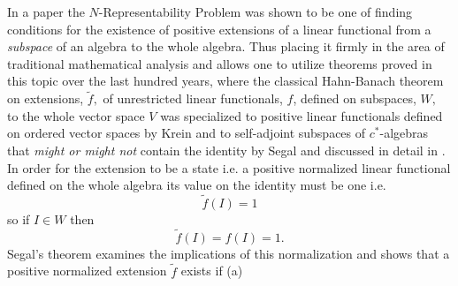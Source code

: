 \documentclass[aps,preprint,amsfonts,amssymb,showpacs,showkeys]{revtex4}%
\begin{document}
In a paper \cite{Weiner83} the $N$-Representability Problem was shown to be
one of finding conditions for the existence of positive extensions of a linear
functional from a \emph{subspace} of an algebra to the whole algebra. Thus
placing it firmly in the area of traditional mathematical analysis and allows
one to utilize theorems proved in this topic over the last hundred years,
where the classical Hahn-Banach theorem \cite{Encyclo} on extensions,
$\tilde{f},$ of unrestricted linear functionals, $f$, defined on subspaces,
$W,$ to the whole vector space $V$ was specialized to positive linear
functionals defined on ordered vector spaces by Krein \cite{Krein,Naimark} and
to self-adjoint subspaces of $c^{\ast}$-algebras \cite{Encyclo} that
\emph{might or might not }contain the identity by Segal \cite{Segal} and
discussed in detail in \cite{KadisonRinrose}. In order for the extension to be
a state \cite{Encyclo} i.e. a positive normalized linear functional defined on
the whole algebra its value on the identity must be one i.e.
\begin{equation}
\tilde{f}\left(  I\right)  =1
\end{equation}
so if $I\in W$ then
\begin{equation}
\tilde{f}\left(  I\right)  =f\left(  I\right)  =1.
\end{equation}
Segal's theorem examines the implications of this normalization and shows that
a positive normalized extension $\tilde{f}$ exists if (a)%
\end{document}
